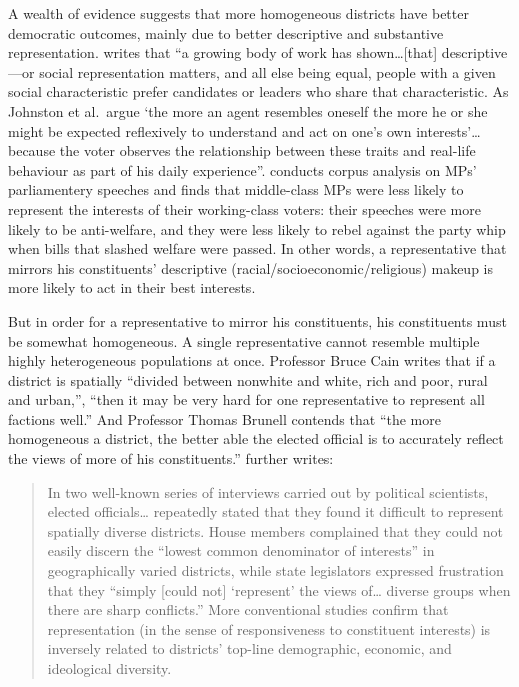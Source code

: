 \documentclass[]{article}
\begin{document}
A wealth of evidence suggests that more homogeneous districts have
better democratic outcomes, mainly due to better descriptive and
substantive representation. \cite{heath2018} writes that ``a growing
body of work has shown\ldots{}{[}that{]} descriptive---or social
representation matters, and all else being equal, people with a given
social characteristic prefer candidates or leaders who share that
characteristic. As Johnston et al.~argue `the more an agent resembles
oneself the more he or she might be expected reflexively to understand
and act on one's own interests'\ldots{} because the voter observes the
relationship between these traits and real-life behaviour as part of his
daily experience''. \cite{ogrady2018} conducts corpus analysis on MPs'
parliamentery speeches and finds that middle-class MPs were less likely
to represent the interests of their working-class voters: their speeches
were more likely to be anti-welfare, and they were less likely to rebel
against the party whip when bills that slashed welfare were passed. In
other words, a representative that mirrors his constituents' descriptive
(racial/socioeconomic/religious) makeup is more likely to act in their
best interests.

But in order for a representative to mirror his constituents, his
constituents must be somewhat homogeneous. A single representative
cannot resemble multiple highly heterogeneous populations at once.
Professor Bruce Cain writes that if a district is spatially ``divided
between nonwhite and white, rich and poor, rural and urban,'', ``then it
may be very hard for one representative to represent all factions
well.'' And Professor Thomas Brunell contends that ``the more
homogeneous a district, the better able the elected official is to
accurately reflect the views of more of his constituents.''
\cite{steph2012} further writes:

\begin{quote}
In two well-known series of interviews carried out by political
scientists, elected officials\ldots{} repeatedly stated that they found
it difficult to represent spatially diverse districts. House members
complained that they could not easily discern the ``lowest common
denominator of interests'' in geographically varied districts, while
state legislators expressed frustration that they ``simply {[}could
not{]} `represent' the views of\ldots{} diverse groups when there are
sharp conflicts.'' More conventional studies confirm that representation
(in the sense of responsiveness to constituent interests) is inversely
related to districts' top-line demographic, economic, and ideological
diversity.
\end{quote}
\end{document}
